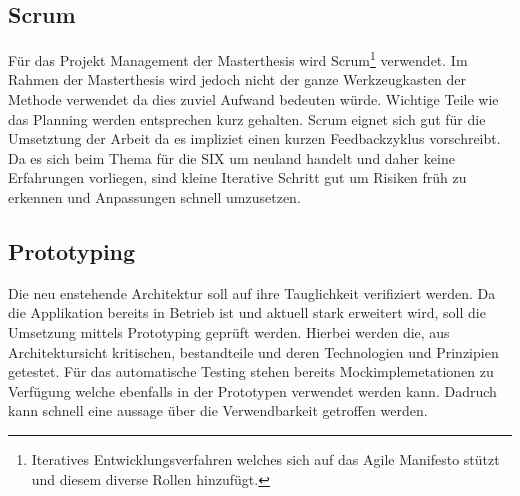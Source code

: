 \subsection{Scrum}

Für das Projekt Management der Masterthesis wird Scrum\footnote{Iteratives Entwicklungsverfahren welches sich auf das Agile Manifesto stützt und diesem diverse Rollen hinzufügt. } verwendet. Im Rahmen der Masterthesis wird jedoch nicht der ganze Werkzeugkasten der Methode verwendet da dies zuviel Aufwand bedeuten würde. Wichtige Teile wie das Planning werden entsprechen kurz gehalten.
Scrum eignet sich gut für die Umsetztung der Arbeit da es impliziet einen kurzen Feedbackzyklus vorschreibt. Da es sich beim Thema für die SIX um neuland handelt und daher keine Erfahrungen vorliegen, sind kleine Iterative Schritt gut um Risiken früh zu erkennen und Anpassungen schnell umzusetzen.

\subsection{Prototyping}
Die neu enstehende Architektur soll auf ihre Tauglichkeit verifiziert werden. Da die Applikation bereits in Betrieb ist und aktuell stark erweitert wird, soll die Umsetzung mittels Prototyping geprüft werden. Hierbei werden die, aus Architektursicht kritischen, bestandteile und deren Technologien und Prinzipien getestet. Für das automatische Testing stehen bereits Mockimplemetationen zu Verfügung welche ebenfalls in der Prototypen verwendet werden kann. Dadruch kann schnell eine aussage über die Verwendbarkeit getroffen werden. 
